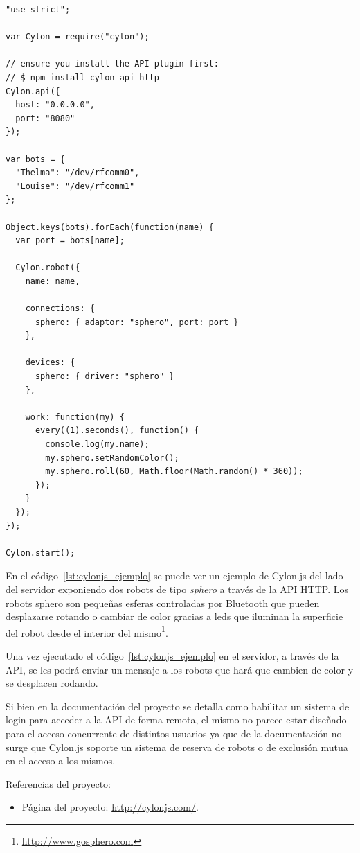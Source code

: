 \begin{lstlisting}[caption={Cylon.js controlando 2 robots ``sphero''
usando HTTP (extraído del sitio oficial del proyecto)},
label={lst:cylonjs_ejemplo}]
"use strict";

var Cylon = require("cylon");

// ensure you install the API plugin first:
// $ npm install cylon-api-http
Cylon.api({
  host: "0.0.0.0",
  port: "8080"
});

var bots = {
  "Thelma": "/dev/rfcomm0",
  "Louise": "/dev/rfcomm1"
};

Object.keys(bots).forEach(function(name) {
  var port = bots[name];

  Cylon.robot({
    name: name,

    connections: {
      sphero: { adaptor: "sphero", port: port }
    },

    devices: {
      sphero: { driver: "sphero" }
    },

    work: function(my) {
      every((1).seconds(), function() {
        console.log(my.name);
        my.sphero.setRandomColor();
        my.sphero.roll(60, Math.floor(Math.random() * 360));
      });
    }
  });
});

Cylon.start();
\end{lstlisting}

En el código~\ref{lst:cylonjs_ejemplo} se puede ver un ejemplo de
Cylon.js del lado del servidor exponiendo dos robots de tipo
\textit{sphero} a través de la API HTTP. Los robots sphero son pequeñas
esferas controladas por Bluetooth que pueden desplazarse rotando o
cambiar de color gracias a
leds que iluminan la superficie del robot desde el interior del
mismo\footnote{\url{http://www.gosphero.com}}.

Una vez ejecutado el código~\ref{lst:cylonjs_ejemplo} en el servidor,
a través de la API, se
les podrá enviar un mensaje a los robots que hará que cambien
de color
y se desplacen
rodando.

Si bien en la documentación del proyecto se detalla como habilitar
un sistema de login para acceder a la API de forma remota, el mismo
no parece estar diseñado para el acceso concurrente de distintos usuarios
ya que de la documentación no surge que Cylon.js soporte un sistema
de reserva de robots o de exclusión mutua en el acceso a los mismos.

Referencias del proyecto:
\begin{itemize}
    \item Página del proyecto: \url{http://cylonjs.com/}.
\end{itemize}


